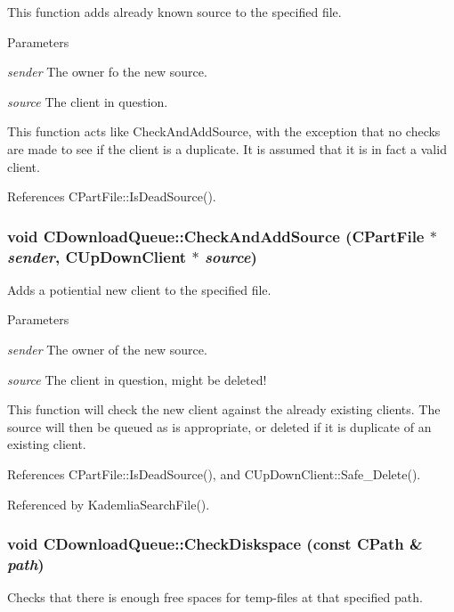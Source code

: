 This function adds already known source to the specified file. 
\begin{DoxyParams}{Parameters}
\item[{\em sender}]The owner fo the new source. \item[{\em source}]The client in question.\end{DoxyParams}
This function acts like CheckAndAddSource, with the exception that no checks are made to see if the client is a duplicate. It is assumed that it is in fact a valid client. 

References CPartFile::IsDeadSource().
\subsubsection[{CheckAndAddSource}]{\setlength{\rightskip}{0pt plus 5cm}void CDownloadQueue::CheckAndAddSource ({\bf CPartFile} $\ast$ {\em sender}, \/  {\bf CUpDownClient} $\ast$ {\em source})}\label{classCDownloadQueue_aec828dff750b3c73b48fd6315f5c91bd}


Adds a potiential new client to the specified file. 
\begin{DoxyParams}{Parameters}
\item[{\em sender}]The owner of the new source. \item[{\em source}]The client in question, might be deleted!\end{DoxyParams}
This function will check the new client against the already existing clients. The source will then be queued as is appropriate, or deleted if it is duplicate of an existing client. 

References CPartFile::IsDeadSource(), and CUpDownClient::Safe\_\-Delete().

Referenced by KademliaSearchFile().
\subsubsection[{CheckDiskspace}]{\setlength{\rightskip}{0pt plus 5cm}void CDownloadQueue::CheckDiskspace (const {\bf CPath} \& {\em path})\hspace{0.3cm}{\ttfamily  [private]}}\label{classCDownloadQueue_a0c0544c0709d17e5fa565d0442fa5656}


Checks that there is enough free spaces for temp-\/files at that specified path. 

